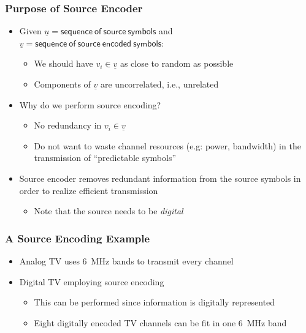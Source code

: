 \documentclass[10pt]{beamer}
\begin{document}
\frame
{
  \frametitle{Purpose of Source Encoder}

  \begin{itemize}
    \item Given $\underline{u}=\mathsf{sequence~of~source~symbols}$ and $\underline{v}=\mathsf{sequence~of~source~encoded~symbols}$:
    \begin{itemize}
        \item We should have $v_{i}\in\underline{v}$ as close to random as possible
        \item Components of $\underline{v}$ are uncorrelated, i.e., unrelated
    \end{itemize}
    \item Why do we perform source encoding?
    \begin{itemize}
        \item No redundancy in $v_{i} \in \underline{v}$
        \item Do not want to waste channel resources (e.g: power, bandwidth) in the transmission of ``predictable symbols''
    \end{itemize}
    \item Source encoder removes redundant information from the source symbols in order to realize efficient transmission
    \begin{itemize}
        \item Note that the source needs to be {\it digital}
    \end{itemize}
\end{itemize}
}
\frame
{
  \frametitle{A Source Encoding Example}

  \begin{itemize}
    \item Analog TV uses 6~MHz bands to transmit every channel
    \item Digital TV employing source encoding
    \begin{itemize}
        \item This can be performed since information is digitally represented
        \item Eight digitally encoded TV channels can be fit in one 6~MHz band
    \end{itemize}
  \end{itemize}

}
\end{document}
